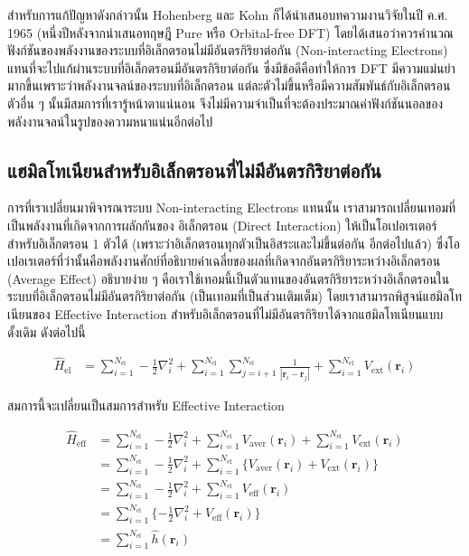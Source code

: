 สำหรับการแก้ปัญหาดังกล่าวนั้น Hohenberg และ Kohn ก็ได้นำเสนอบทความงานวิจัยในปี ค.ศ. 1965 (หนึ่งปีหลังจากนำเสนอทฤษฎี Pure หรือ 
Orbital-free DFT) โดยได้เสนอว่าควรคำนวณฟังก์ชันของพลังงานของระบบที่อิเล็กตรอนไม่มีอันตรกิริยาต่อกัน (Non-interacting Electrons) 
แทนที่จะไปแก้ผ่านระบบที่อิเล็กตรอนมีอันตรกิริยาต่อกัน ซึ่งมีข้อดีคือทำให้การ DFT มีความแม่นยำมากขึ้นเพราะว่าพลังงานจลน์ของระบบที่อิเล็กตรอน%
แต่ละตัวไม่ขึ้นหรือมีความสัมพันธ์กับอิเล็กตรอนตัวอื่น ๆ นั้นมีสมการที่เรารู้หน้าตาแน่นอน จึงไม่มีความจำเป็นที่จะต้องประมาณค่าฟังก์ชันนอลของ%
พลังงานจลน์ในรูปของความหนาแน่นอีกต่อไป

\subsection{แฮมิลโทเนียนสำหรับอิเล็กตรอนที่ไม่มีอันตรกิริยาต่อกัน}
\label{ssec:hamil_noninter_elec}

การที่เราเปลี่ยนมาพิจารณาระบบ Non-interacting Electrons แทนนั้น เราสามารถเปลี่ยนเทอมที่เป็นพลังงานที่เกิดจากการผลักกันของ%
อิเล็กตรอน (Direct Interaction) ให้เป็นโอเปอเรเตอร์สำหรับอิเล็กตรอน 1 ตัวได้ (เพราะว่าอิเล็กตรอนทุกตัวเป็นอิสระและไม่ขึ้นต่อกัน%
อีกต่อไปแล้ว) ซึ่งโอเปอเรเตอร์ที่ว่านั้นคือพลังงานศักย์ที่อธิบายค่าเฉลี่ยของผลที่เกิดจากอันตรกิริยาระหว่างอิเล็กตรอน (Average Effect) 
อธิบายง่าย ๆ คือเราใช้เทอมนี้เป็นตัวแทนของอันตรกิริยาระหว่างอิเล็กตรอนในระบบที่อิเล็กตรอนไม่มีอันตรกิริยาต่อกัน (เป็นเทอมที่เป็นส่วนเติมเต็ม) 
โดยเราสามารถพิสูจน์แฮมิลโทเนียนของ Effective Interaction สำหรับอิเล็กตรอนที่ไม่มีอันตรกิริยาได้จากแฮมิลโทเนียนแบบดั้งเดิม ดังต่อไปนี้

\begin{align}\label{eq:hamil_inter_elec}
    \hat{H}_{\text{el}} &= \sum^{N_{\text{el}}}_{i=1} -\frac{1}{2} \nabla^{2}_{i} 
    + \sum^{N_{\text{el}}}_{i=1} \sum^{N_{\text{el}}}_{j=i+1} \frac{1}{|\bm{r}_{i}-\bm{r}_{j}|}
    + \sum^{N_{\text{el}}}_{i=1} V_{\text{ext}}(\bm{r}_{i})
\end{align}

\noindent สมการนี้จะเปลี่ยนเป็นสมการสำหรับ Effective Interaction

\begin{align}\label{eq:hamil_noninter_eff}
    \hat{H}_{\text{eff}} &= \sum^{N_{\text{el}}}_{i=1} -\frac{1}{2} \nabla^{2}_{i} 
    + \sum^{N_{\text{el}}}_{i=1} V_{\text{aver}}(\bm{r}_{i})
    + \sum^{N_{\text{el}}}_{i=1} V_{\text{ext}}(\bm{r}_{i}) \nonumber \\
    &= \sum^{N_{\text{el}}}_{i=1} -\frac{1}{2} \nabla^{2}_{i} 
    + \sum^{N_{\text{el}}}_{i=1} \{ V_{\text{aver}}(\bm{r}_{i}) + V_{\text{ext}}(\bm{r}_{i}) \} \nonumber \\
    &= \sum^{N_{\text{el}}}_{i=1} -\frac{1}{2} \nabla^{2}_{i} 
    + \sum^{N_{\text{el}}}_{i=1} V_{\text{eff}}(\bm{r}_{i}) \nonumber \\
    &= \sum^{N_{\text{el}}}_{i=1} \{ -\frac{1}{2} \nabla^{2}_{i} + V_{\text{eff}}(\bm{r}_{i}) \} \nonumber \\
    &= \sum^{N_{\text{el}}}_{i=1} \hat{h}(\bm{r}_{i})
\end{align}

